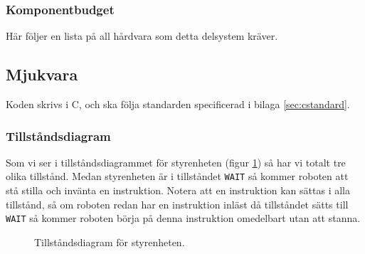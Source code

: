 \documentclass[a4paper,11pt]{article}
\begin{document}
\subsubsection{Komponentbudget}
Här följer en lista på all hårdvara som detta delsystem kräver.

\begin{HardwareList}
\end{HardwareList}

\subsection{Mjukvara}
Koden skrivs i C, och ska följa standarden specificerad i bilaga \ref{sec:cstandard}. 

\clearpage

\subsubsection{Tillståndsdiagram}
Som vi ser i tillståndsdiagrammet för styrenheten (figur \ref{fig:stateDiagram}) så har vi totalt tre olika tillstånd. Medan styrenheten är i tillståndet \texttt{WAIT} så kommer roboten att stå stilla och invänta en instruktion. Notera att en instruktion kan sättas i alla tillstånd, så om roboten redan har en instruktion inläst då tillståndet sätts till \texttt{WAIT} så kommer roboten börja på denna instruktion omedelbart utan att stanna.

\begin{figure}[h!]
	\caption{Tillståndsdiagram för styrenheten.}
	\label{fig:stateDiagram}
\end{figure}
\end{document}

